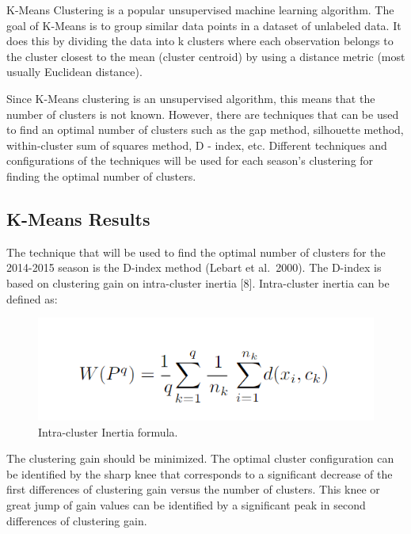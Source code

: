 \documentclass[]{book}
\begin{document}
K-Means Clustering is a popular unsupervised machine learning algorithm. The goal of K-Means is to group similar data points in a dataset of unlabeled data. It does this by dividing the data into k clusters where each observation belongs to the cluster closest to the mean (cluster centroid) by using a distance metric (most usually Euclidean distance).

Since K-Means clustering is an unsupervised algorithm, this means that the number of clusters is not known. However, there are techniques that can be used to find an optimal number of clusters such as the gap method, silhouette method, within-cluster sum of squares method, D - index, etc. Different techniques and configurations of the techniques will be used for each season's clustering for finding the optimal number of clusters.

\hypertarget{k-means-results}{%
\subsection{K-Means Results}\label{k-means-results}}

The technique that will be used to find the optimal number of clusters for the 2014-2015 season is the D-index method (Lebart et al.~2000). The D-index is based on clustering gain on intra-cluster inertia {[}8{]}. Intra-cluster inertia can be deﬁned as:

\begin{figure}
\centering
\includegraphics{images/inertia.png}
\caption{Intra-cluster Inertia formula.}
\end{figure}

The clustering gain should be minimized. The optimal cluster conﬁguration can be identiﬁed by the sharp knee that corresponds to a signiﬁcant decrease of the ﬁrst differences of clustering gain versus the number of clusters. This knee or great jump of gain values can be identiﬁed by a signiﬁcant peak in second differences of clustering gain.
\end{document}
